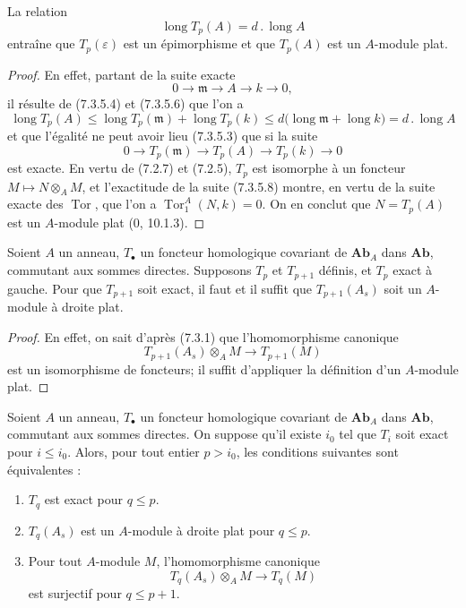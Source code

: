 \begin{lemma}[7.3.5.7]
La relation
\[
  \operatorname{long}T_p(A)=d\mathbin{.}\operatorname{long}A
\]
entraîne que $T_p(\varepsilon)$ est un épimorphisme et que $T_p(A)$ est un
$A$-module plat.
\end{lemma}

\begin{proof}
En effet, partant de la suite exacte
\[
  0\longrightarrow\mathfrak m\longrightarrow A\longrightarrow k
  \longrightarrow0,
\]
il résulte de (7.3.5.4) et (7.3.5.6) que l'on a
\[
  \operatorname{long}T_p(A)
  \leq
  \operatorname{long}T_p(\mathfrak m)+\operatorname{long}T_p(k)
  \leq
  d\bigl(\operatorname{long}\mathfrak m+\operatorname{long}k\bigr)
  =d\mathbin{.}\operatorname{long}A
\]
et que l'égalité ne peut avoir lieu (7.3.5.3) que si la suite
\[
  0\longrightarrow T_p(\mathfrak m)\longrightarrow T_p(A)
  \longrightarrow T_p(k)\longrightarrow0
  \tag{7.3.5.8}\label{III.7.3.5.8.fr}
\]
est exacte. En vertu de (7.2.7) et (7.2.5), $T_p$ est isomorphe à un foncteur
$M\mapsto N\otimes_A M$, et l'exactitude de la suite (7.3.5.8) montre, en vertu
de la suite exacte des $\operatorname{Tor}$, que l'on a
$\operatorname{Tor}_1^A(N,k)=0$. On en conclut que $N=T_p(A)$ est un
$A$-module plat (0, 10.1.3).
\end{proof}

\begin{lemma}[7.3.6]
Soient $A$ un anneau, $T_\bullet$ un foncteur homologique covariant de
$\mathbf{Ab}_A$ dans $\mathbf{Ab}$, commutant aux sommes directes. Supposons
$T_p$ et $T_{p+1}$ définis, et $T_p$ exact à gauche. Pour que $T_{p+1}$ soit
exact, il faut et il suffit que $T_{p+1}(A_s)$ soit un $A$-module à droite
plat.
\end{lemma}

\begin{proof}
En effet, on sait d'après (7.3.1) que l'homomorphisme canonique
\[
  T_{p+1}(A_s)\otimes_A M\longrightarrow T_{p+1}(M)
\]
est un isomorphisme de foncteurs; il suffit d'appliquer la définition d'un
$A$-module plat.
\end{proof}

\begin{proposition}[7.3.7]
Soient $A$ un anneau, $T_\bullet$ un foncteur homologique covariant de
$\mathbf{Ab}_A$ dans $\mathbf{Ab}$, commutant aux sommes directes. On suppose
qu'il existe $i_0$ tel que $T_i$ soit exact pour $i\leq i_0$. Alors, pour tout
entier $p>i_0$, les conditions suivantes sont équivalentes :
\begin{enumerate}
  \item[a)] $T_q$ est exact pour $q\leq p$.
  \item[b)] $T_q(A_s)$ est un $A$-module à droite plat pour $q\leq p$.
  \item[c)] Pour tout $A$-module $M$, l'homomorphisme canonique
    \[
      T_q(A_s)\otimes_A M\longrightarrow T_q(M)
    \]
    est surjectif pour $q\leq p+1$.
\end{enumerate}
\end{proposition}

